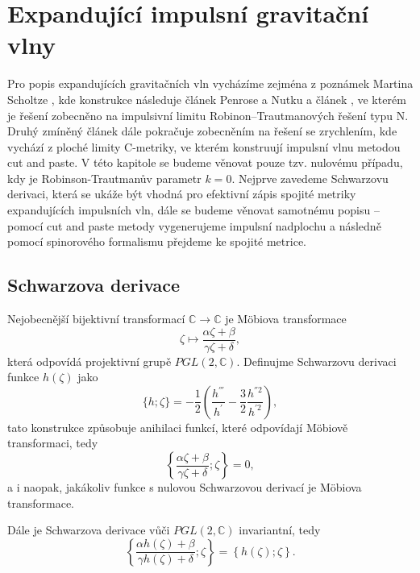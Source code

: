 \section{Expandující impulsní gravitační vlny}
Pro popis expandujících gravitačních vln vycházíme zejména z poznámek Martina Scholtze \cite{scholtz_notes}, kde konstrukce následuje článek
Penrose a Nutku \cite{PenroseNutku1992} a článek \cite{Aliev2001}, ve kterém je řešení zobecněno na impulsivní limitu Robinon--Trautmanových řešení typu N.
Druhý zmíněný článek dále pokračuje zobecněním na řešení se zrychlením, kde vychází z ploché limity C-metriky, ve kterém konstruují impulsní vlnu metodou cut and paste.
V této kapitole se budeme věnovat pouze tzv. nulovému případu, kdy je Robinson-Trautmanův parametr $k=0$.
Nejprve zavedeme Schwarzovu derivaci, která se ukáže být vhodná pro efektivní zápis spojité metriky expandujících impulsních vln,
dále se budeme věnovat samotnému popisu -- pomocí cut and paste metody vygenerujeme impulsní nadplochu a následně pomocí spinorového
formalismu přejdeme ke spojité metrice.
\subsection{Schwarzova derivace}
Nejobecnější bijektivní transformací $\mathbb{C} \to \mathbb{C}$ je Möbiova transformace
\begin{equation}
    \zeta \mapsto \frac{\alpha \zeta + \beta}{\gamma \zeta + \delta},
\end{equation}
která odpovídá projektivní grupě $PGL(2, \mathbb{C})$. Definujme Schwarzovu derivaci funkce $h(\zeta)$ jako
\begin{equation}
    \{h; \zeta\} = -\frac{1}{2}\left(\frac{h^{'''}}{h^{'}} - \frac{3}{2} \frac{h^{''2}}{h^{'2}}\right),
\end{equation}
tato konstrukce způsobuje anihilaci funkcí, které odpovídají Möbiově transformaci, tedy
\begin{equation}
    \left\{ \frac{\alpha \zeta + \beta}{\gamma \zeta + \delta}; \zeta \right\} = 0,
\end{equation}
a i naopak, jakákoliv funkce s nulovou Schwarzovou derivací je Möbiova transformace.

Dále je Schwarzova derivace vůči $PGL(2, \mathbb{C})$ invariantní, tedy
\begin{equation}
    \left\{ \frac{\alpha h(\zeta) + \beta}{\gamma h(\zeta) + \delta} ; \zeta \right\} = \left\{ h(\zeta); \zeta \right\}.
\end{equation}

